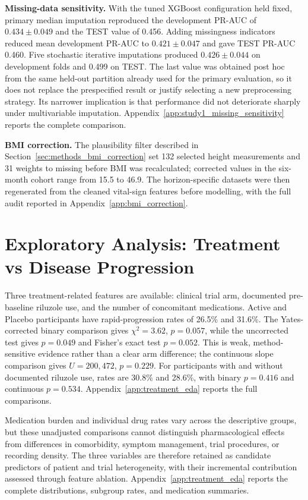 \noindent\textbf{Missing-data sensitivity.}
With the tuned XGBoost configuration held fixed, primary median imputation reproduced the development \gls{PR-AUC} of $0.434\pm0.049$ and the TEST value of 0.456. Adding missingness indicators reduced mean development PR-AUC to $0.421\pm0.047$ and gave TEST PR-AUC 0.460. Five stochastic iterative imputations produced $0.426\pm0.044$ on development folds and 0.499 on TEST. The last value was obtained post hoc from the same held-out partition already used for the primary evaluation, so it does not replace the prespecified result or justify selecting a new preprocessing strategy. Its narrower implication is that performance did not deteriorate sharply under multivariable imputation. Appendix~\ref{app:study1_missing_sensitivity} reports the complete comparison.


\label{sec:results_bmi_fix}
\noindent\textbf{BMI correction.}
The plausibility filter described in Section~\ref{sec:methods_bmi_correction} set 132 selected height measurements and 31 weights to missing before \gls{BMI} was recalculated; corrected values in the six-month cohort range from 15.5 to 46.9. The horizon-specific datasets were then regenerated from the cleaned vital-sign features before modelling, with the full audit reported in Appendix~\ref{app:bmi_correction}.


\section{Exploratory Analysis: Treatment vs Disease Progression}
\label{sec:results_eda_treatment}

Three treatment-related features are available: clinical trial arm, documented pre-baseline riluzole use, and the number of concomitant medications. Active and Placebo participants have rapid-progression rates of 26.5\% and 31.6\%. The Yates-corrected binary comparison gives $\chi^2=3.62$, $p=0.057$, while the uncorrected test gives $p=0.049$ and Fisher's exact test $p=0.052$. This is weak, method-sensitive evidence rather than a clear arm difference; the continuous slope comparison gives $U=200{,}472$, $p=0.229$. For participants with and without documented riluzole use, rates are 30.8\% and 28.6\%, with binary $p=0.416$ and continuous $p=0.534$. Appendix~\ref{app:treatment_eda} reports the full comparisons.

Medication burden and individual drug rates vary across the descriptive groups, but these unadjusted comparisons cannot distinguish pharmacological effects from differences in comorbidity, symptom management, trial procedures, or recording density. The three variables are therefore retained as candidate predictors of patient and trial heterogeneity, with their incremental contribution assessed through feature ablation. Appendix~\ref{app:treatment_eda} reports the complete distributions, subgroup rates, and medication summaries.


